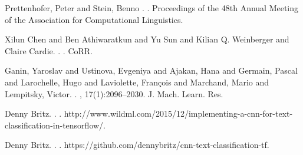 \documentclass[11pt,a4paper]{article}
\begin{document}
\begin{thebibliography}{}
Prettenhofer, Peter and Stein, Benno
.
.
\newblock Proceedings of the 48th Annual Meeting of the Association for Computational Linguistics.

Xilun Chen and Ben Athiwaratkun and Yu Sun and Kilian Q. Weinberger and Claire Cardie.
.
.
\newblock CoRR.

Ganin, Yaroslav and Ustinova, Evgeniya and Ajakan, Hana and Germain, Pascal and Larochelle, Hugo and Laviolette, Fran\c{c}ois and Marchand, Mario and Lempitsky, Victor.
.
,
  17(1):2096--2030.
\newblock J. Mach. Learn. Res.

Denny Britz.
.
.
\newblock http://www.wildml.com/2015/12/implementing-a-cnn-for-text-classification-in-tensorflow/.

Denny Britz.
.
.
\newblock https://github.com/dennybritz/cnn-text-classification-tf.


\end{thebibliography}
\end{document}
